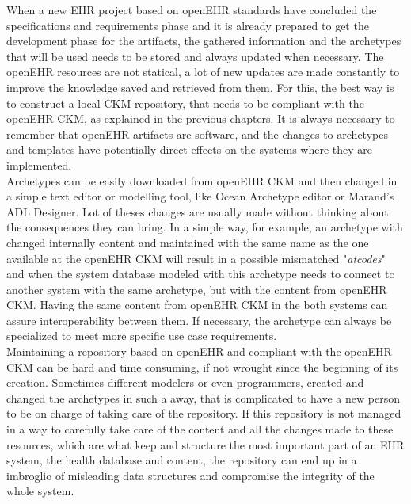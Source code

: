 \documentclass[mim_thesis.tex]{subfiles}
\begin{document}
When a new EHR project based on openEHR standards have concluded the specifications and requirements phase and it is already prepared to get the development phase for the artifacts, the gathered information and the archetypes that will be used needs to be stored and always updated when necessary. The openEHR resources are not statical, a lot of new updates are made constantly to improve the knowledge saved and retrieved from them. For this, the best way is to construct a local CKM repository, that needs to be compliant with the openEHR CKM, as explained in the previous chapters. It is always necessary to remember that openEHR artifacts are software, and the changes to archetypes and templates have potentially direct effects on the systems where they are implemented.  \\ 

Archetypes can be easily downloaded from openEHR CKM and then changed in a simple text editor or modelling tool, like Ocean Archetype editor or Marand's ADL Designer. Lot of theses changes are usually made without thinking about the consequences they can bring. In a simple way, for example, an archetype with changed internally content and maintained with the same name as the one available at the openEHR CKM will result in a possible mismatched "\textit{atcodes}" and when the system database modeled with this archetype needs to connect to another system with the same archetype, but with the content from openEHR CKM. Having the same content from openEHR CKM in the both systems can assure interoperability between them. If necessary, the archetype can always be specialized to meet more specific use case requirements. \\

Maintaining a repository based on openEHR and compliant with the openEHR CKM can be hard and time consuming, if not wrought since the beginning of its creation. Sometimes different modelers or even programmers, created and changed the archetypes in such a away, that is complicated to have a new person to be on charge of taking care of the repository. If this repository is not managed in a way to carefully take care of the content and all the changes made to these resources, which are what keep and structure the most important part of an EHR system, the health database and content, the repository can end up in a imbroglio of misleading data structures and compromise the integrity of the whole system. \\
\end{document}
